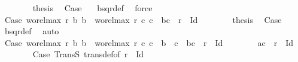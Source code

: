 \begin{isabellebody}
\ \ \ \ \ \ \isamarkupfalse%
\ {\isacharquery}{\kern0pt}thesis\ \isamarkupfalse%
\ Case{}\ {}\ \isamarkupfalse%
\ bsqr{\isacharunderscore}{\kern0pt}def\ \isamarkupfalse%
\ force\isanewline
\ \ \ \ \ \isacommand{{\isacharbraceright}{\kern0pt}}\isamarkupfalse%
\isanewline
\ \ \ \ \ \isamarkupfalse%
\isanewline
\ \ \ \ \ \isacommand{{\isacharbraceleft}{\kern0pt}}\isamarkupfalse%
\isamarkupfalse%
\ Case{}{}{\isacharcolon}{\kern0pt}\ {\isachardoublequoteopen}wo{\isacharunderscore}{\kern0pt}rel{\isachardot}{\kern0pt}max{}\ r\ b{}\ b{}\ {\isacharequal}{\kern0pt}\ wo{\isacharunderscore}{\kern0pt}rel{\isachardot}{\kern0pt}max{}\ r\ c{}\ c{}\ {\isasymand}\ {\isacharparenleft}{\kern0pt}b{}{\isacharcomma}{\kern0pt}c{}{\isacharparenright}{\kern0pt}\ {\isasymin}\ r\ {\isacharminus}{\kern0pt}\ Id{\isachardoublequoteclose}\isanewline
\ \ \ \ \ \ \isamarkupfalse%
\ {\isacharquery}{\kern0pt}thesis\ \isamarkupfalse%
\ Case{}\ {}\ \isamarkupfalse%
\ bsqr{\isacharunderscore}{\kern0pt}def\ \isamarkupfalse%
\ auto\isanewline
\ \ \ \ \ \isacommand{{\isacharbraceright}{\kern0pt}}\isamarkupfalse%
\isanewline
\ \ \ \ \ \isamarkupfalse%
\isanewline
\ \ \ \ \ \isacommand{{\isacharbraceleft}{\kern0pt}}\isamarkupfalse%
\isamarkupfalse%
\ Case{}{}{\isacharcolon}{\kern0pt}\ {\isachardoublequoteopen}wo{\isacharunderscore}{\kern0pt}rel{\isachardot}{\kern0pt}max{}\ r\ b{}\ b{}\ {\isacharequal}{\kern0pt}\ wo{\isacharunderscore}{\kern0pt}rel{\isachardot}{\kern0pt}max{}\ r\ c{}\ c{}\ {\isasymand}\ b{}\ {\isacharequal}{\kern0pt}\ c{}\ {\isasymand}\ {\isacharparenleft}{\kern0pt}b{}{\isacharcomma}{\kern0pt}c{}{\isacharparenright}{\kern0pt}\ {\isasymin}\ r\ {\isacharminus}{\kern0pt}\ Id{\isachardoublequoteclose}\isanewline
\ \ \ \ \ \ \isamarkupfalse%
\ {\isachardoublequoteopen}{\isacharparenleft}{\kern0pt}a{}{\isacharcomma}{\kern0pt}c{}{\isacharparenright}{\kern0pt}\ {\isasymin}\ r\ {\isacharminus}{\kern0pt}\ Id{\isachardoublequoteclose}\isanewline
\ \ \ \ \ \ \isamarkupfalse%
\ Case{}\ TransS\ trans{\isacharunderscore}{\kern0pt}def{\isacharbrackleft}{\kern0pt}of\ {\isachardoublequoteopen}r\ {\isacharminus}{\kern0pt}\ Id{\isachardoublequoteclose}{\isacharbrackright}{\kern0pt}\ \isamarkupfalse%

\end{isabellebody}
